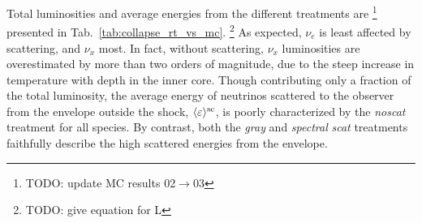 \documentclass[aps,floatfix,prd,superscriptaddress,twocolumn]{revtex4-1}
\begin{document}
Total luminosities and average energies from the different treatments are
\footnote{TODO: update MC results 02$\rightarrow0$3}
presented in Tab.~\ref{tab:collapse_rt_vs_mc}.
\footnote{TODO: give equation for L}
As expected, $\nu_e$ is least affected by scattering, and $\nu_x$ most.
In fact, without scattering, $\nu_x$ luminosities are overestimated by more than
two orders of magnitude, due to the steep increase in temperature with depth
in the inner core.
Though contributing only a fraction of the total luminosity,
the average energy of neutrinos scattered to the observer from the envelope
outside the shock, $\langle\varepsilon\rangle^{\rm sc}$,
is poorly characterized by the \emph{noscat} treatment for all species.
By contrast, both the \emph{gray} and \emph{spectral} \emph{scat} treatments
faithfully describe the high scattered energies from the envelope.
\end{document}
